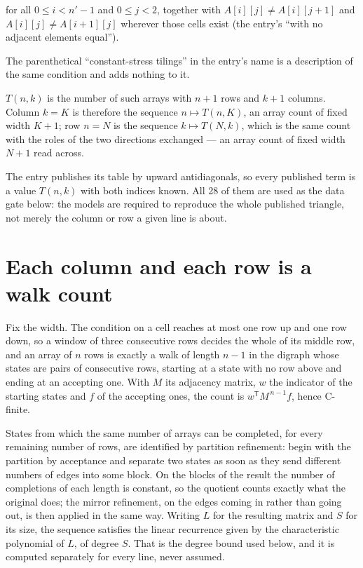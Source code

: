 \documentclass[11pt]{article}
\theoremstyle{definition}
\begin{document}
for all $0 \le i < n'-1$ and $0 \le j < 2$, together with $A[i][j] \ne A[i][j{+}1]$ and $A[i][j] \ne A[i{+}1][j]$ wherever those cells exist (the entry's ``with no adjacent elements equal'').

The parenthetical ``constant-stress tilings'' in the entry's name is a description of the same condition and adds nothing to it.

$T(n,k)$ is the number of such arrays with $n + 1$ rows and $k + 1$ columns. Column $k = K$ is therefore the sequence $n \mapsto T(n,K)$, an array count of fixed width $K + 1$; row $n = N$ is the sequence $k \mapsto T(N,k)$, which is the same count with the roles of the two directions exchanged --- an array count of fixed width $N + 1$ read across.

The entry publishes its table by upward antidiagonals, so every published term is a value $T(n,k)$ with both indices known. All 28 of them are used as the data gate below: the models are required to reproduce the whole published triangle, not merely the column or row a given line is about.

\section{Each column and each row is a walk count}

Fix the width. The condition on a cell reaches at most one row up and one row down, so a window of three consecutive rows decides the whole of its middle row, and an array of $n$ rows is exactly a walk of length $n-1$ in the digraph whose states are pairs of consecutive rows, starting at a state with no row above and ending at an accepting one. With $M$ its adjacency matrix, $w$ the indicator of the starting states and $f$ of the accepting ones, the count is $w^{\mathsf T}M^{\,n-1}f$, hence C-finite.

States from which the same number of arrays can be completed, for every remaining number of rows, are identified by partition refinement: begin with the partition by acceptance and separate two states as soon as they send different numbers of edges into some block. On the blocks of the result the number of completions of each length is constant, so the quotient counts exactly what the original does; the mirror refinement, on the edges coming in rather than going out, is then applied in the same way. Writing $L$ for the resulting matrix and $S$ for its size, the sequence satisfies the linear recurrence given by the characteristic polynomial of $L$, of degree $S$. That is the degree bound used below, and it is computed separately for every line, never assumed.
\end{document}
